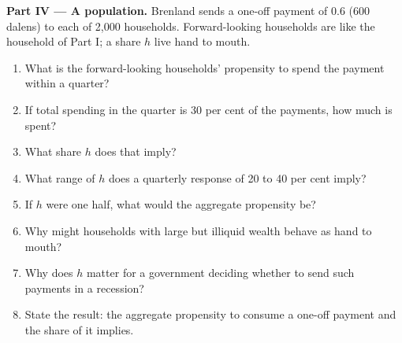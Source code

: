 \begin{problem}
\medskip
\noindent\textbf{Part IV --- A population.} Brenland sends a one-off payment of 0.6 (600 dalens) to each of 2{,}000 households. Forward-looking
households are like the household of Part I; a share $h$ live hand to mouth.
\begin{enumerate}[resume]
  \item What is the forward-looking households' propensity to spend the payment within a quarter?
  \item If total spending in the quarter is 30 per cent of the payments, how much is spent?
  \item What share $h$ does that imply?
  \item What range of $h$ does a quarterly response of 20 to 40 per cent imply?
  \item If $h$ were one half, what would the aggregate propensity be?
  \item Why might households with large but illiquid wealth behave as hand to mouth?
  \item Why does $h$ matter for a government deciding whether to send such payments in a recession?
  \item State the result: the aggregate propensity to consume a one-off payment and the share of  it
    implies.
\end{enumerate}
\end{problem}
